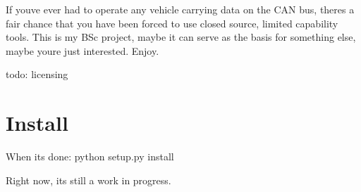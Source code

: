 If you\textquotesingle{}ve ever had to operate any vehicle carrying data on the C\+AN bus, there\textquotesingle{}s a fair chance that you have been forced to use closed source, limited capability tools. This is my B\+Sc project, maybe it can serve as the basis for something else, maybe you\textquotesingle{}re just interested. Enjoy.

todo\+: licensing

\section*{Install }

When it\textquotesingle{}s done\+: {\ttfamily python setup.\+py install}

Right now, it\textquotesingle{}s still a work in progress. 